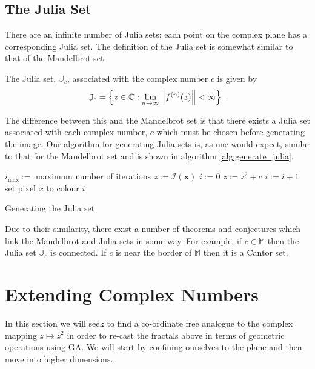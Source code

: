 \subsection{The Julia Set}

There are an infinite number of Julia sets; each point on the complex plane
has a corresponding Julia set. The definition of the Julia set is somewhat
similar to that of the Mandelbrot set.

\begin{definition}
The Julia set, $\mathbb{J}_c$, associated
with the complex number $c$ is given by
\[
\mathbb{J}_c = 
\left\{z \in \mathbb{C}
: \lim_{n \rightarrow \infty} \left\Vert f^{(n)}(z) \right\Vert < \infty \right\}.
\]
\end{definition}

The difference between this and the Mandelbrot set is that there exists a 
Julia set associated with each complex number, $c$ which must be chosen before
generating the image. Our algorithm for generating Julia sets is, as one would
expect, similar to that for the Mandelbrot set and is shown in algorithm
\ref{alg:generate_julia}.

\begin{fancyalg}
\begin{algorithmic}[1]
\STATE $i_{\mathrm{max}} :=$ maximum number of iterations
\STATE $z := {\mathcal I}(\mathbf{x})$
\STATE $i := 0$
  \STATE $z := z^2 + c$
  \STATE $i := i+1$
\ENDWHILE 
\STATE set pixel $x$ to colour $i$
\ENDFOR
\end{algorithmic}
\caption{
\label{alg:generate_julia}
  Generating the Julia set}
\end{fancyalg}

Due to their similarity, there exist a number of theorems and conjectures which link the
Mandelbrot and Julia sets in some way. For example, if $c \in \mathbb{M}$ then
the Julia set $\mathbb{J}_c$ is connected\cite{FRAC:JuliaAndMandelbrotSets}.
If $c$ is near the border of $\mathbb{M}$ then it is a Cantor
set\cite{FRAC:JuliaAndMandelbrotSets}.

\section{Extending Complex Numbers}

In this section we will seek to find a co-ordinate free analogue to the
complex mapping $z \mapsto z^2$ in order to re-cast the fractals above in
terms of geometric operations using GA. We will start by confining ourselves
to the plane and then move into higher dimensions.


